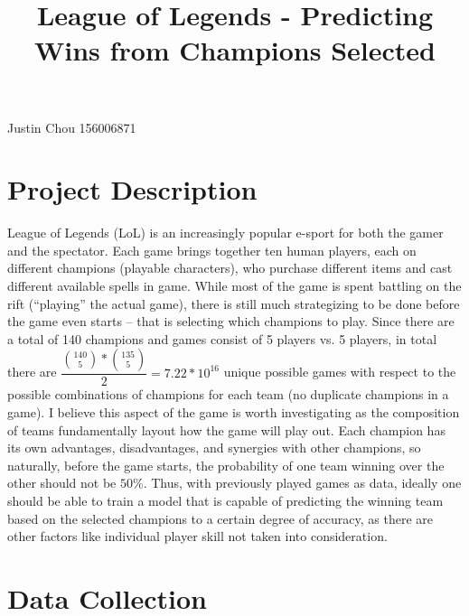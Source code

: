 \documentclass[11pt]{article}
\title{League of Legends - Predicting Wins from Champions Selected}
\begin{document}
    
    
    \maketitle
    
    

    
    Justin Chou 156006871

    \section{Project Description}\label{project-description}

    League of Legends (LoL) is an increasingly popular e-sport for both the
gamer and the spectator. Each game brings together ten human players,
each on different champions (playable characters), who purchase
different items and cast different available spells in game. While most
of the game is spent battling on the rift (``playing'' the actual game),
there is still much strategizing to be done before the game even starts
-- that is selecting which champions to play. Since there are a total of
140 champions and games consist of 5 players vs. 5 players, in total
there are
\(\dfrac{{140 \choose 5} * {135 \choose 5}}{2} = 7.22*10^{16}\) unique
possible games with respect to the possible combinations of champions
for each team (no duplicate champions in a game). I believe this aspect
of the game is worth investigating as the composition of teams
fundamentally layout how the game will play out. Each champion has its
own advantages, disadvantages, and synergies with other champions, so
naturally, before the game starts, the probability of one team winning
over the other should not be \(50\%\). Thus, with previously played
games as data, ideally one should be able to train a model that is
capable of predicting the winning team based on the selected champions
to a certain degree of accuracy, as there are other factors like
individual player skill not taken into consideration.

    \section{Data Collection}\label{data-collection}
\end{document}

